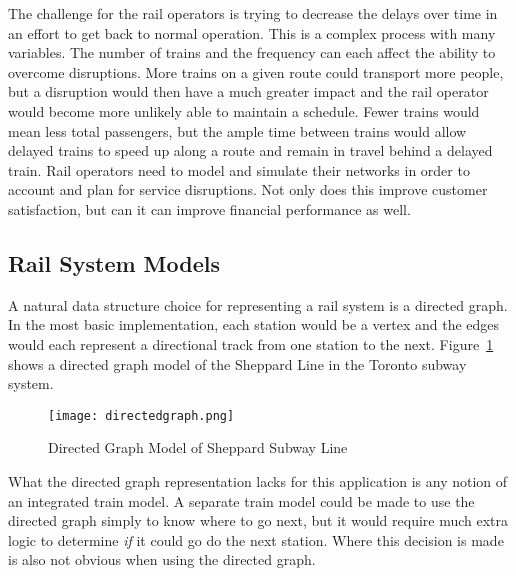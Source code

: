 The challenge for the rail operators is trying to decrease the delays over time
in an effort to get back to normal operation.  This is a complex process with
many variables.  The number of trains and the frequency can each affect the
ability to overcome disruptions.  More trains on a given route could transport
more people, but a disruption would then have a much greater impact and the rail
operator would become more unlikely able to maintain a schedule.  Fewer trains
would mean less total passengers, but the ample time between trains would allow
delayed trains to speed up along a route and remain in travel behind a delayed
train. Rail operators need to model and simulate their networks in order to
account and plan for service disruptions.  Not only does this improve customer
satisfaction, but can it can improve financial performance as well.

\subsection{Rail System Models}

A natural data structure choice for representing a rail system is a directed
graph.  In the most basic implementation, each station would be a vertex and the
edges would each represent a directional track from one station to the next.
Figure~\ref{fig:directedgraph} shows a directed graph model of the Sheppard Line
in the Toronto subway system.

\begin{figure}[htb]
	\centering
	\texttt{[image: directedgraph.png]}
	\caption{Directed Graph Model of Sheppard Subway Line}
	\label{fig:directedgraph}
\end{figure}

What the directed graph representation lacks for this application is any notion
of an integrated train model. A separate train model could be made to use the
directed graph simply to know where to go next, but it would require much extra
logic to determine \textit{if} it could go do the next station.  Where this
decision is made is also not obvious when using the directed graph.


